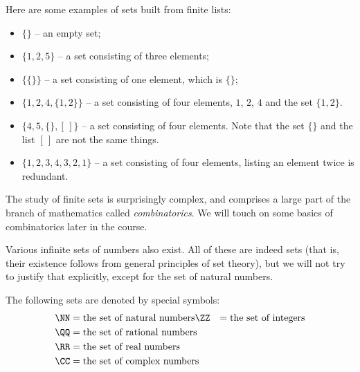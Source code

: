 \begin{example}
Here are some examples of sets built from finite lists:
\begin{itemize}
\item $\{\}$ -- an empty set;
\item $\{1,2,5\}$ -- a set consisting of three elements;
\item $\{\{\}\}$ -- a set consisting of one element, which is $\{\}$;
\item $\{1,2,4,\{1,2\}\}$ -- a set consisting of four elements, $1$,
  $2$, $4$ and the set $\{1,2\}$.
\item $\{4,5, \{\}, [\,]\}$ -- a set consisting of four elements. Note that
the set $\{\}$ and the list $[\,]$ are not the same things.
\item $\{1,2,3,4,3,2,1\}$ -- a set consisting of four elements, listing an element twice is redundant.
\end{itemize}
\end{example}

The study of finite sets is surprisingly complex, and comprises a large part of
the branch of mathematics called \emph{combinatorics}. We will touch on some basics
of combinatorics later in the course. 

Various infinite sets of numbers also exist. All of these are indeed sets (that is, their existence follows from general principles
of set theory), but we will not try to justify that explicitly, except for the set of natural numbers.

\begin{defn}
	The following sets are denoted by special symbols:
	\begin{align*}
		\NN &= \text{the set of natural numbers}
		\ZZ &= \text{the set of integers}\\
		\QQ &= \text{the set of rational numbers}\\
		\RR &= \text{the set of real numbers}\\
		\CC &= \text{the set of complex numbers}
	\end{align*}
\end{defn}

\printbreak

